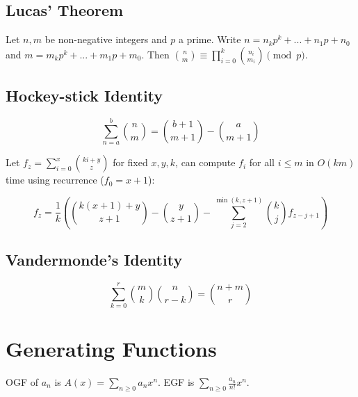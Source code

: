 

	\subsection{Lucas' Theorem}
		Let $n,m$ be non-negative integers and $p$ a prime. Write $n=n_kp^k+...+n_1p+n_0$ and $m=m_kp^k+...+m_1p+m_0$. Then $\binom{n}{m} \equiv \prod_{i=0}^k\binom{n_i}{m_i} \pmod{p}$.

	\subsection{Hockey-stick Identity}
		\[ \sum_{n=a}^b \binom{n}{m} = \binom{b+1}{m+1} - \binom{a}{m+1} \]
		
		Let $f_z=\sum_{i=0}^x \binom{ki+y}{z}$ for fixed $x, y, k$, can compute $f_i$ for all $i \leq m$ in $O(km)$ time using recurrence ($f_0=x+1$):

		$$ f_z = \frac{1}{k}(\binom{k(x+1)+y}{z+1} - \binom{y}{z+1} - \sum_{j=2}^{\min(k,z+1)} \binom{k}{j} f_{z-j+1}) $$

	\subsection{Vandermonde's Identity}
		\[ \sum_{k=0}^r \binom{m}{k}\binom{n}{r-k} = \binom{n+m}{r} \]

\columnbreak
		
\section{Generating Functions}
	OGF of $a_n$ is $A(x)=\sum_{n \ge 0}a_nx^n$. EGF is $\sum_{n \ge 0}\frac{a_n}{n!}x^n$.

